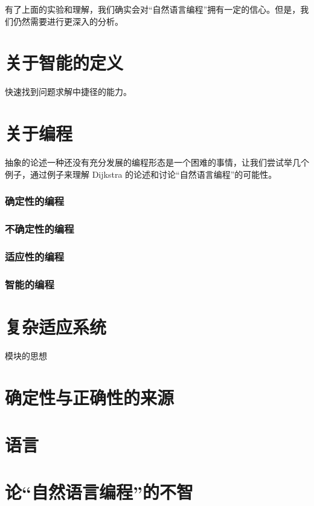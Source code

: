 \documentclass[a4paper,12pt]{article}
\begin{document}
有了上面的实验和理解，我们确实会对“自然语言编程”拥有一定的信心。但是，我们仍然需要进行更深入的分析。

\section{关于智能的定义}

快速找到问题求解中捷径的能力。

\section{关于编程}

抽象的论述一种还没有充分发展的编程形态是一个困难的事情，让我们尝试举几个例子，通过例子来理解 Dijkstra 的论述和讨论“自然语言编程”的可能性。

\subsubsection{确定性的编程}

\subsubsection{不确定性的编程}

\subsubsection{适应性的编程}

\subsubsection{智能的编程}

\section{复杂适应系统}

模块的思想

\section{确定性与正确性的来源}

\section{语言}

\newpage

\appendix

\section{论“自然语言编程”的不智}
\end{document}
